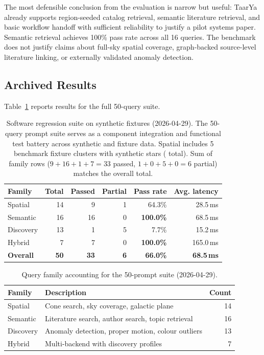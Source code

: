 \documentclass[12pt]{elsarticle}
\begin{document}
The most defensible conclusion from the evaluation is narrow but useful: \textsf{TaarYa} already supports region-seeded catalog retrieval, semantic literature retrieval, and basic workflow handoff with sufficient reliability to justify a pilot systems paper. Semantic retrieval achieves 100\% pass rate across all 16 queries. The benchmark does not justify claims about full-sky spatial coverage, graph-backed source-level literature linking, or externally validated anomaly detection.

\subsection{Archived Results}
\label{sec:results}

Table~\ref{tab:benchmark} reports results for the full 50-query suite.

\begin{table}[htbp]
\centering
\caption{Software regression suite on synthetic fixtures (2026-04-29). The 50-query prompt suite serves as a component integration and functional test battery across synthetic and fixture data. Spatial includes 5 benchmark fixture clusters with synthetic stars (\nStarsSynthetic{} total). Sum of family rows ($9 + 16 + 1 + 7 = 33$ passed, $1 + 0 + 5 + 0 = 6$ partial) matches the overall total.}
\label{tab:benchmark}
\begin{tabular}{lrrrrr}
\toprule
\textbf{Family} & \textbf{Total} & \textbf{Passed} & \textbf{Partial} & \textbf{Pass rate} & \textbf{Avg. latency} \\
\midrule
Spatial   & 14 &  9 &  1 & 64.3\%  & 28.5\,ms \\
Semantic  & 16 & 16 &  0 & \textbf{100.0\%} & 68.5\,ms \\
Discovery & 13 &  1 &  5 &  7.7\%  & 15.2\,ms \\
Hybrid    &  7 &  7 &  0 & \textbf{100.0\%} & 165.0\,ms \\
\midrule
\textbf{Overall} & \textbf{50} & \textbf{33} & \textbf{6} & \textbf{66.0\%} & \textbf{68.5\,ms} \\
\bottomrule
\end{tabular}
\end{table}

\begin{table}[htbp]
\centering
\caption{Query family accounting for the 50-prompt suite (2026-04-29).}
\label{tab:query_accounting}
\begin{tabular}{p{2.8cm}p{7.9cm}r}
\toprule
\textbf{Family} & \textbf{Description} & \textbf{Count} \\
\midrule
Spatial & Cone search, sky coverage, galactic plane & 14 \\
Semantic & Literature search, author search, topic retrieval & 16 \\
Discovery & Anomaly detection, proper motion, colour outliers & 13 \\
Hybrid & Multi-backend with discovery profiles & 7 \\
\bottomrule
\end{tabular}
\end{table}
\end{document}

